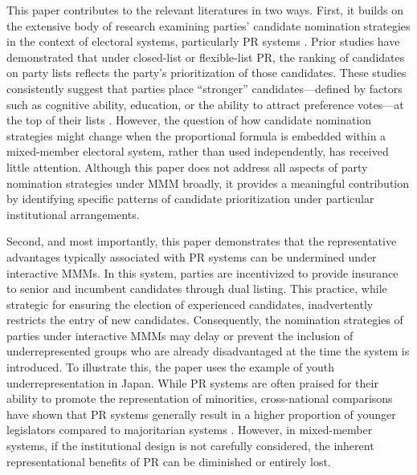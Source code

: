 \documentclass[a4paper, 11pt]{article}
\begin{document}
This paper contributes to the relevant literatures in two ways. First, it builds on the extensive body of research examining parties' candidate nomination strategies in the context of electoral systems, particularly PR systems \citep{andrePartyNominationStrategies2017, buisseretPartyNominationStrategies2022, crutzenModelTeamContest2020, dancygierElectoralRulesElectoral2014, hoboltSelectionSanctioningEuropean2011, nemotoLocalismCoordinationThree2013}. Prior studies have demonstrated that under closed-list or flexible-list PR, the ranking of candidates on party lists reflects the party’s prioritization of those candidates. These studies consistently suggest that parties place “stronger” candidates—defined by factors such as cognitive ability, education, or the ability to attract preference votes—at the top of their lists \citep{buisseretPartyNominationStrategies2022, coxMoralHazardElectoral2021}. However, the question of how candidate nomination strategies might change when the proportional formula is embedded within a mixed-member electoral system, rather than used independently, has received little attention. Although this paper does not address all aspects of party nomination strategies under MMM broadly, it provides a meaningful contribution by identifying specific patterns of candidate prioritization under particular institutional arrangements. 

Second, and most importantly, this paper demonstrates that the representative advantages typically associated with PR systems can be undermined under interactive MMMs. In this system, parties are incentivized to provide insurance to senior and incumbent candidates through dual listing. This practice, while strategic for ensuring the election of experienced candidates, inadvertently restricts the entry of new candidates. Consequently, the nomination strategies of parties under interactive MMMs may delay or prevent the inclusion of underrepresented groups who are already disadvantaged at the time the system is introduced. To illustrate this, the paper uses the example of youth underrepresentation in Japan. While PR systems are often praised for their ability to promote the representation of minorities, cross-national comparisons have shown that PR systems generally result in a higher proportion of younger legislators compared to majoritarian systems \citep{stockemerAgeRepresentationParliaments2018, stockemerAgeInequalitiesPolitical2023}. However, in mixed-member systems, if the institutional design is not carefully considered, the inherent representational benefits of PR can be diminished or entirely lost.
\end{document}

